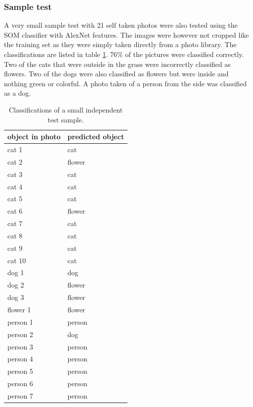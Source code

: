 \documentclass[doc/report.tex]{subfiles}
\newcommand{\err}{\cellcolor{red!25}}
\begin{document}
\subsubsection{Sample test}
A very small sample test with 21 self taken photos were also tested using the
SOM classifier with AlexNet features. The images were however not cropped like
the training set as they were simply taken directly from a photo library. The
classifications are listed in table \ref{tbl:sample}. 76\% of the pictures were
classified correctly. Two of the cats that were outside in the grass were
incorrectly classified as flowers. Two of the dogs were also classified as
flowers but were inside and nothing green or colorful. A photo taken of a
person from the side was classified as a dog.
    
\begin{table}[h]
    \centering
    \begin{tabular}{ll}
        object in photo & predicted object \\\hline
        cat 1       & cat \\
        cat 2       & \err flower \\
        cat 3       & cat \\
        cat 4       & cat \\
        cat 5       & cat \\
        cat 6       & \err flower \\
        cat 7       & cat \\
        cat 8       & cat \\
        cat 9       & cat \\
        cat 10      & cat \\
        dog 1       & dog \\
        dog 2       & \err flower \\
        dog 3       & \err flower \\
        flower 1    & flower \\
        person 1    & person \\
        person 2    & \err dog \\
        person 3    & person \\
        person 4    & person \\
        person 5    & person \\
        person 6    & person \\
        person 7    & person \\
    \end{tabular}%
    \caption{Classifications of a small independent test sample.}
    \label{tbl:sample}
\end{table}
\end{document}

